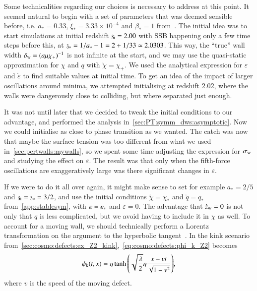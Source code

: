 


Some technicalities regarding our choices is necessary to address at this point.  %
It seemed natural to begin with a set of parameters that was deemed sensible before, i.e. $a_\ast = 0.33$, $\xi_\ast = 3.33\times 10^{-4}$ and $\beta_\ast = 1$ from~\citet{christiansenAsevolutionRelativisticNbody2023}. %
The initial idea was to start simulations at initial redshift $\mathfrak{z}_\mathrm{i}=2.00$ with SSB happening only a few time steps before this, at $\mathfrak{z}_\ast = 1/a_\ast - 1 = 2 + 1/33 \simeq 2.0303$. This way, the ``true'' wall width $\delta_\mathrm{w} = (a\mu\chi_+)^{-1}$ is not infinite at the start, and we may use the quasi-static approximation for $\chi$ and $q$ with $\breve{\chi}= \chi_+$. We used the analytical expression for $\varepsilon$ and $\dot{\varepsilon}$ to find suitable values at initial time. To get an idea of the impact of larger oscillations around minima, we attempted initialising at redshift $2.02$, where the walls were dangerously close to colliding, but where separated just enough. 



It was not until later that we decided to tweak the initial conditions to our advantage, and performed the analysis in~\cref{sec:PT:symm_dws:asymptotic}. Now we could initialise as close to phase transition as we wanted. The catch was now that maybe the surface tension was too different from what we used in~\cref{sec:pertwalls:mywalls}, so we spent some time adjusting the expression for $\sigma_\mathrm{w}$ and studying the effect on $\varepsilon$. The result was that only when the fifth-force oscillations are exaggeratively large was there significant changes in $\varepsilon$. 


If we were to do it all over again, it might make sense to set %
for example 
$a_\ast = 2/5$ and $\mathfrak{z}_\mathrm{i}=\mathfrak{z}_\ast = 3/2$, %
and use the initial conditions $\breve{\chi}=\chi_\ast$ and $\breve{q}=q_\ast$ from~\cref{app:stablesym}, with $\varepsilon=\varepsilon_\ast$ and $\dot{\varepsilon}=0$. %
The advantage that $\dot{z}_\mathrm{w}=0$ is not only that $q$ is less complicated, but we avoid having to include it in $\chi$ as well. To account for a moving wall, we should technically perform a Lorentz transformation on the argument to the hyperbolic tangent~\citep{vachaspatiKinksDomainWalls2006,blanco-pilladoDynamicsDomainWall2023}. In the kink scenario from~\cref{sec:cosmo:defects:ex_Z2_kink},~\cref{eq:cosmo:defects:phi_k_Z2} becomes~\citep{vachaspatiKinksDomainWalls2006}
\begin{equation}
    \phi_\mathrm{k}(t, x ) = \eta \tanh{{\left( \sqrt{\frac{\lambda}{2}}\eta  \frac{x - vt}{\sqrt{1-v^2}}  \right)}},
\end{equation}
where $v$ is the speed of the moving defect.

